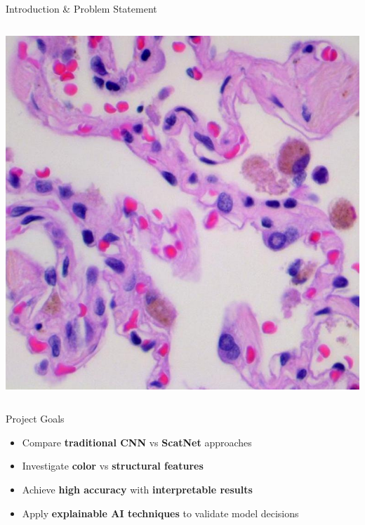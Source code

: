 \documentclass[aspectratio=169,8pt]{beamer}  %
\begin{document}
\begin{frame}{Introduction \& Problem Statement}
\begin{columns}[T]
\begin{column}{0.5\textwidth}
\vspace{0.2cm}
\hfill\includegraphics[width=0.95\linewidth, height=0.45\textheight]{imgs/benign.jpg}
\end{column}
\end{columns}
\end{frame}

\begin{frame}{Project Goals}
\begin{itemize}
\item Compare \textbf{traditional CNN} vs \textbf{ScatNet} approaches
\item Investigate \textbf{color} vs \textbf{structural features}
\item Achieve \textbf{high accuracy} with \textbf{interpretable results}
\item Apply \textbf{explainable AI techniques} to validate model decisions
\end{itemize}
\end{frame}
\end{document}

